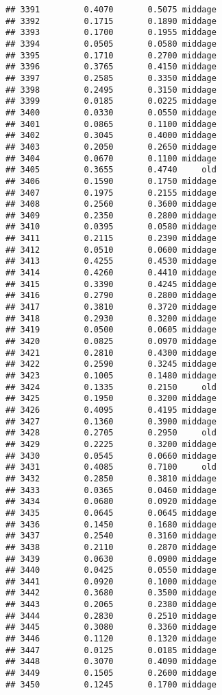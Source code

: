 \documentclass[
]{article}
\begin{document}
\begin{verbatim}
## 3391         0.4070       0.5075 middage
## 3392         0.1715       0.1890 middage
## 3393         0.1700       0.1955 middage
## 3394         0.0505       0.0580 middage
## 3395         0.1710       0.2700 middage
## 3396         0.3765       0.4150 middage
## 3397         0.2585       0.3350 middage
## 3398         0.2495       0.3150 middage
## 3399         0.0185       0.0225 middage
## 3400         0.0330       0.0550 middage
## 3401         0.0865       0.1100 middage
## 3402         0.3045       0.4000 middage
## 3403         0.2050       0.2650 middage
## 3404         0.0670       0.1100 middage
## 3405         0.3655       0.4740     old
## 3406         0.1590       0.1750 middage
## 3407         0.1975       0.2155 middage
## 3408         0.2560       0.3600 middage
## 3409         0.2350       0.2800 middage
## 3410         0.0395       0.0580 middage
## 3411         0.2115       0.2390 middage
## 3412         0.0510       0.0600 middage
## 3413         0.4255       0.4530 middage
## 3414         0.4260       0.4410 middage
## 3415         0.3390       0.4245 middage
## 3416         0.2790       0.2800 middage
## 3417         0.3810       0.3720 middage
## 3418         0.2930       0.3200 middage
## 3419         0.0500       0.0605 middage
## 3420         0.0825       0.0970 middage
## 3421         0.2810       0.4300 middage
## 3422         0.2590       0.3245 middage
## 3423         0.1005       0.1480 middage
## 3424         0.1335       0.2150     old
## 3425         0.1950       0.3200 middage
## 3426         0.4095       0.4195 middage
## 3427         0.1360       0.3900 middage
## 3428         0.2705       0.2950     old
## 3429         0.2225       0.3200 middage
## 3430         0.0545       0.0660 middage
## 3431         0.4085       0.7100     old
## 3432         0.2850       0.3810 middage
## 3433         0.0365       0.0460 middage
## 3434         0.0680       0.0920 middage
## 3435         0.0645       0.0645 middage
## 3436         0.1450       0.1680 middage
## 3437         0.2540       0.3160 middage
## 3438         0.2110       0.2870 middage
## 3439         0.0630       0.0900 middage
## 3440         0.0425       0.0550 middage
## 3441         0.0920       0.1000 middage
## 3442         0.3680       0.3500 middage
## 3443         0.2065       0.2380 middage
## 3444         0.2830       0.2510 middage
## 3445         0.3080       0.3360 middage
## 3446         0.1120       0.1320 middage
## 3447         0.0125       0.0185 middage
## 3448         0.3070       0.4090 middage
## 3449         0.1505       0.2600 middage
## 3450         0.1245       0.1700 middage

\end{verbatim}
\end{document}
